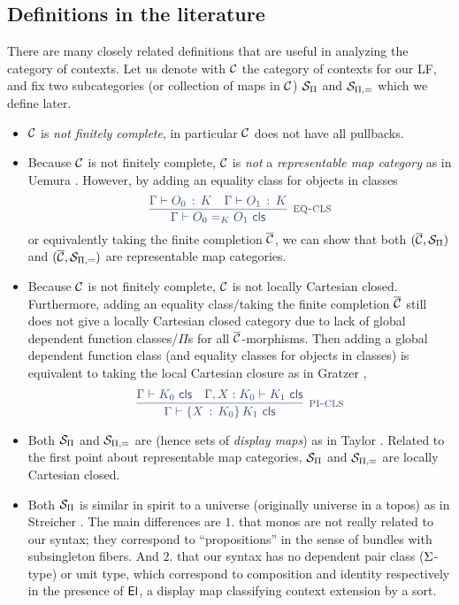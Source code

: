 \subsection{Definitions in the literature}
There are many closely related definitions that are useful in analyzing the category of contexts.
Let us denote with $\mathcal{C}$ the category of contexts for our LF,
and fix two subcategories (or collection of maps in $\mathcal{C}$) $\mathcal{S}_{\Pi}$ and $\mathcal{S}_{\Pi,=}$ which we define later.
\begin{itemize}
  \item $\mathcal{C}$ is \textit{not finitely complete}, in particular $\mathcal{C}$ does not have all pullbacks.
  \item Because $\mathcal{C}$ is not finitely complete, $\mathcal{C}$ is
        \textit{not} a \textit{representable map category}
        as in Uemura \cite{uemura2019general}.
        However, by {\color{syntax} adding an equality class for objects in classes}
        \[\color{syntax}
            \infer[\textsc{eq-cls}]{\ClsJdg{\Ga}{\EqCS{K}{O_0}{O_1}}}
            {\ObjJdg{\Ga}{O_0}{K} & \ObjJdg{\Ga}{O_1}{K}}
        \]
        or equivalently {\color{semantics} taking the finite completion $\overline{\mathcal{C}}$},
        we can show that both $(\overline{\mathcal{C}},\mathcal{S}_{\Pi})$ and $(\overline{\mathcal{C}},\mathcal{S}_{\Pi,=})$ are representable map categories.
  \item Because $\mathcal{C}$ is not finitely complete, $\mathcal{C}$ is not locally Cartesian closed.
        Furthermore, adding an equality class/taking the finite completion $\overline{\mathcal{C}}$
        still does not give a locally Cartesian closed category due to lack of
        {\color{syntax} global dependent function classes}/{\color{semantics}$\Pi$s for all $\overline{\mathcal{C}}$-morphisms}.
        Then {\color{syntax} adding a global dependent function class (and equality classes for objects in classes)}
        is equivalent to {\color{semantics} taking the local Cartesian closure as in Gratzer \cite{gratzer2021syntactic}},
        \[\color{syntax}
          \infer[\textsc{pi-cls}]{\ClsJdg{\Ga}{\PiCS{X}{K_{0}}{K_{1}}}}
            {\ClsJdg{\Ga}{K_{0}} & \ClsJdg{\CtxExt{\Ga}{X}{K_{0}}}{K_{1}}}
        \]
  \item Both $\mathcal{S}_{\Pi}$ and $\mathcal{S}_{\Pi,=}$ are \textit{}
        (hence sets of \textit{display maps}) as in Taylor \cite{Taylor1999}.
        Related to the first point about representable map categories,
        $\mathcal{S}_{\Pi}$ and $\mathcal{S}_{\Pi,=}$ are locally Cartesian closed.
  \item Both $\mathcal{S}_{\Pi}$ is similar in spirit to a universe (originally universe in a topos) as in Streicher \cite{streicher}.
        The main differences are $1.$ that {\color{semantics} monos} are not really related to our syntax;
        they correspond to ``propositions'' in the sense of bundles with subsingleton fibers.
        And $2.$ that our syntax has no {\color{syntax} dependent pair class ($\Sigma$-type) or unit type},
        which correspond to {\color{semantics} composition and identity respectively} in the presence of $\mathsf{El}$,
        a display map classifying context extension by a sort.
\end{itemize}

